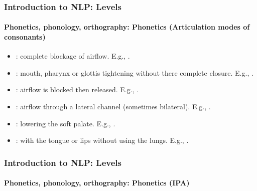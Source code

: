 \documentclass[xcolor=table]{beamer}
\begin{document}
\begin{frame}
\frametitle{Introduction to NLP: Levels}
\framesubtitle{Phonetics, phonology, orthography: Phonetics (Articulation modes of consonants)}

\begin{itemize}
	\item {}: complete blockage of airflow.
	E.g., \expword{\textipa{[p], [k], [b], [m], [n]}}.
	
	\item {}: mouth, pharynx or glottis tightening without there complete closure.
	E.g., \expword{\textipa{[f], [v], [s]}}.
	
	\item {}: airflow is blocked then released.
	E.g., \expword{\textipa{[\t{\textteshlig}]}}.
	
	\item {}: airflow through a lateral channel (sometimes bilateral).
	E.g., \expword{\textipa{[l]}}.
	
	\item {}: lowering the soft palate.
	E.g., \expword{\textipa{[m], [n]}}.
	
	\item {}: with the tongue or lips without using the lungs.
	E.g., .
	
\end{itemize}

\end{frame}

\begin{frame}
\frametitle{Introduction to NLP: Levels}
\framesubtitle{Phonetics, phonology, orthography: Phonetics (IPA)}

\begin{center}
\end{center}

\end{frame}
\end{document}

